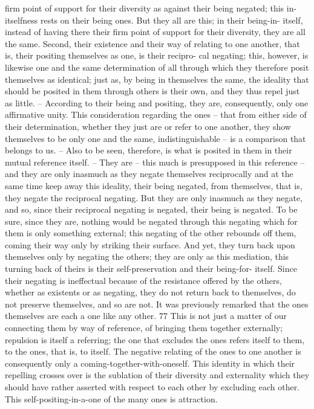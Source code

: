 firm point of support for their diversity as against their being negated; this
in-itselfness rests on their being ones. But they all are this; in their being-in-
itself, instead of having there their firm point of support for their diversity,
they are all the same. Second, their existence and their way of relating
to one another, that is, their positing themselves as one, is their recipro-
cal negating; this, however, is likewise one and the same determination of
all through which they therefore posit themselves as identical; just as, by
being in themselves the same, the ideality that should be posited in them
through others is their own, and they thus repel just as little. – According
to their being and positing, they are, consequently, only one affirmative
unity.
This consideration regarding the ones – that from either side of their
determination, whether they just are or refer to one another, they show
themselves to be only one and the same, indistinguishable – is a comparison
that belongs to us. – Also to be seen, therefore, is what is posited in them
in their mutual reference itself. – They are – this much is presupposed
in this reference – and they are only inasmuch as they negate themselves
reciprocally and at the same time keep away this ideality, their being
negated, from themselves, that is, they negate the reciprocal negating.
But they are only inasmuch as they negate, and so, since their reciprocal
negating is negated, their being is negated. To be sure, since they are,
nothing would be negated through this negating which for them is only
something external; this negating of the other rebounds off them, coming
their way only by striking their surface. And yet, they turn back upon
themselves only by negating the others; they are only as this mediation,
this turning back of theirs is their self-preservation and their being-for-
itself. Since their negating is ineffectual because of the resistance offered by
the others, whether as existents or as negating, they do not return back to
themselves, do not preserve themselves, and so are not.
It was previously remarked that the ones themselves are each a one like
any other. 77 This is not just a matter of our connecting them by way of
reference, of bringing them together externally; repulsion is itself a referring;
the one that excludes the ones refers itself to them, to the ones, that is,
to itself. The negative relating of the ones to one another is consequently
only a coming-together-with-oneself. This identity in which their repelling
crosses over is the sublation of their diversity and externality which they
should have rather asserted with respect to each other by excluding each
other.
This self-positing-in-a-one of the many ones is attraction.

